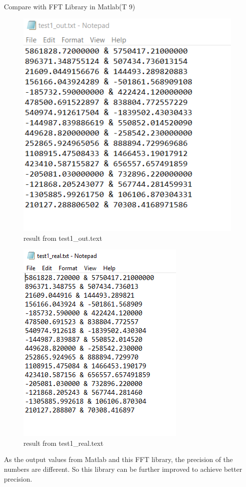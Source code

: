 \documentclass[12pt, titlepage]{article}
\begin{document}
Compare with FFT Library in Matlab(T 9)
\begin{figure}[H]
 \includegraphics[width=\linewidth]{p1.PNG}
  \caption{result from test1\_out.text}
  \label{fig:T4}
\end{figure}\begin{figure}[H]
 \includegraphics[width=\linewidth]{p2.PNG}
  \caption{result from  test1\_real.text}
  \label{fig:T4}
\end{figure}
As the output values from Matlab and this FFT library, the precision of the numbers are different. So this library can be further improved to achieve better precision.
\end{document}

